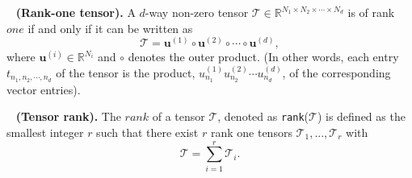 
\begin{definition}~\label{def:rankone}
   \textbf{(Rank-one tensor).} A $d$-way non-zero tensor $\mathcal{T} \in \mathbb{R}^{N_1 \times N_2 \times \cdots \times N_d}$ is of rank $one$ if and only if it can be written as 
    $$
        \mathcal{T} = \mathbf{u}^{(1)} \circ \mathbf{u}^{(2)} \circ \cdots \circ \mathbf{u}^{(d)}, 
    $$
    where $\mathbf{u}^{(i)} \in \mathbb{R}^{N_i}$ and $\circ$ denotes the outer product. (In other words, each entry $t_{n_1,n_2,\cdots,n_d}$ of the tensor is the product, $u_{n_1}^{(1)}u_{n_2}^{(2)}\cdots u_{n_d}^{(d)}$, of the corresponding vector entries).
\end{definition}



\begin{definition}~\label{def:rank}
    \textbf{(Tensor rank).} The $rank$ of a tensor $\mathcal{T}$, denoted as \texttt{rank}($\mathcal{T}$) is defined as the smallest integer $r$ such that there exist $r$ rank one tensors $\mathcal{T}_1, ..., \mathcal{T}_r$ with
    $$
        \mathcal{T} = \sum_{i=1}^{r} 
        \mathcal{T}_i.
    $$
\end{definition}

